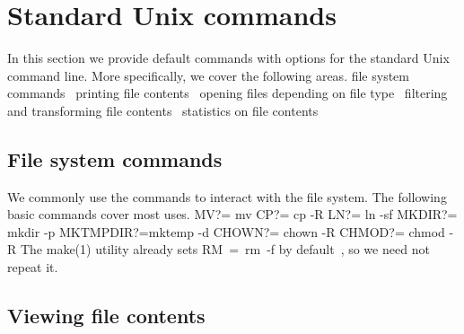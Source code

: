 \section{Standard Unix commands}

In this section we provide default commands with options for the standard Unix 
command line.
More specifically, we cover the following areas.
\nwenddocs{}\endmoddef\nwstartdeflinemarkup{}\nwenddeflinemarkup
\LA{}file system commands~{\nwtagstyle{}}\RA{}
\LA{}printing file contents~{\nwtagstyle{}}\RA{}
\LA{}opening files depending on file type~{\nwtagstyle{}}\RA{}
\LA{}filtering and transforming file contents~{\nwtagstyle{}}\RA{}
\LA{}statistics on file contents~{\nwtagstyle{}}\RA{}
\nwendcode{}\nwdocspar

\subsection{File system commands}

We commonly use the commands to interact with the file system.
The following basic commands cover most uses.
\nwenddocs{}\endmoddef\nwstartdeflinemarkup{}\nwenddeflinemarkup
MV?=      mv
CP?=      cp -R
LN?=      ln -sf
MKDIR?=   mkdir -p
MKTMPDIR?=mktemp -d
CHOWN?=   chown -R
CHMOD?=   chmod -R
\nwendcode{}The make(1) utility already sets {\Tt{}RM\ =\ rm\ -f\nwendquote} by default~\cite[Sect.\ 
10.3]{GNUMake}, so we need not repeat it.

\subsection{Viewing file contents}

